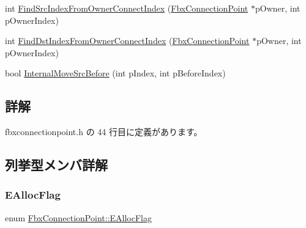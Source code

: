 \begin{DoxyCompactItemize}
\item 
int \hyperlink{class_fbx_connection_point_a5161119d009ab1ab080bd896f0d40346}{Find\+Src\+Index\+From\+Owner\+Connect\+Index} (\hyperlink{class_fbx_connection_point}{Fbx\+Connection\+Point} $\ast$p\+Owner, int p\+Owner\+Index)
\item 
int \hyperlink{class_fbx_connection_point_a6e597c9de1c85034ada54d94bca5a734}{Find\+Dst\+Index\+From\+Owner\+Connect\+Index} (\hyperlink{class_fbx_connection_point}{Fbx\+Connection\+Point} $\ast$p\+Owner, int p\+Owner\+Index)
\item 
bool \hyperlink{class_fbx_connection_point_a90bfb6707fe58f15cd81b9140dc2a8aa}{Internal\+Move\+Src\+Before} (int p\+Index, int p\+Before\+Index)
\end{DoxyCompactItemize}


\subsection{詳解}


 fbxconnectionpoint.\+h の 44 行目に定義があります。



\subsection{列挙型メンバ詳解}
\mbox{\label{class_fbx_connection_point_aab31d193025c9dacc8e95c63aae12531}} 
\subsubsection{\texorpdfstring{E\+Alloc\+Flag}{EAllocFlag}}
{\footnotesize\ttfamily enum \hyperlink{class_fbx_connection_point_aab31d193025c9dacc8e95c63aae12531}{Fbx\+Connection\+Point\+::\+E\+Alloc\+Flag}}

